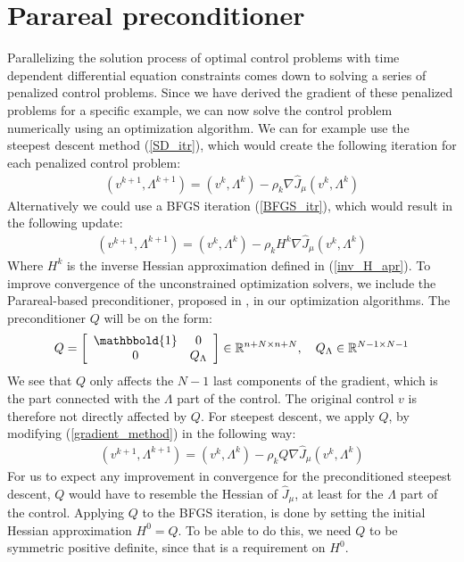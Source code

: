 \section{Parareal preconditioner} \label{pc sec}
Parallelizing the solution process of optimal control problems with time dependent differential equation constraints comes down to solving a series of penalized control problems. Since we have derived the gradient of these penalized problems for a specific example, we can now solve the control problem numerically using an optimization algorithm. We can for example use the steepest descent method (\ref{SD_itr}), which would create the following iteration for each penalized control problem:
\begin{align}
(v^{k+1},\Lambda^{k+1}) = (v^{k},\Lambda^{k}) -\rho_k\nabla\hat{J}_{\mu}(v^{k},\Lambda^{k}) \label{gradient_method}
\end{align}
Alternatively we could use a BFGS iteration (\ref{BFGS_itr}), which would result in the following update:
\begin{align}
(v^{k+1},\Lambda^{k+1}) = (v^{k},\Lambda^{k}) -\rho_kH^{k}\nabla\hat{J}_{\mu}(v^{k},\Lambda^{k}) \label{bfgs_method}
\end{align}
Where $H^k$ is the inverse Hessian approximation defined in (\ref{inv_H_apr}). To improve convergence of the unconstrained optimization solvers, we include the Parareal-based preconditioner, proposed in \cite{maday2002parareal}, in our optimization algorithms. The preconditioner $Q$ will be on the form:
\begin{align}
Q = \left[ \begin{array}{cc}
	\mathbbold{1} & 0 \\
	0 & Q_{\Lambda} \\
	\end{array} \right]\in \mathbb{R}^{n+N\times n+N},\quad Q_{\Lambda}\in\mathbb{R}^{N-1\times N-1} \label{PC_form}
\end{align} 
We see that $Q$ only affects the $N-1$ last components of the gradient, which is the part connected with the $\Lambda$ part of the control. The original control $v$ is therefore not directly affected by $Q$. For steepest descent, we apply $Q$, by modifying (\ref{gradient_method}) in the following way:
\begin{align}
(v^{k+1},\Lambda^{k+1}) = (v^{k},\Lambda^{k}) -\rho_kQ\nabla\hat{J}_{\mu}(v^{k},\Lambda^{k}) \label{gradient_method2}
\end{align}
For us to expect any improvement in convergence for the preconditioned steepest descent, $Q$ would have to resemble the Hessian of $\hat{J}_{\mu}$, at least for the $\Lambda$ part of the control. Applying $Q$ to the BFGS iteration, is done by setting the initial Hessian approximation $H^0=Q$. To be able to do this, we need $Q$ to be symmetric positive definite, since that is a requirement on $H^0$. 
